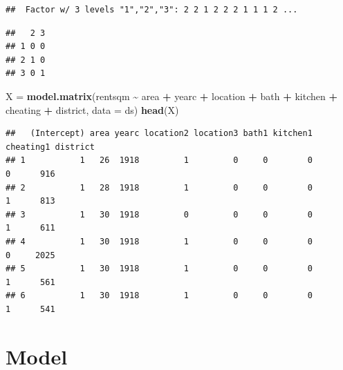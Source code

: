 \documentclass[
]{article}
\newenvironment{Shaded}{\begin{snugshade}}{\end{snugshade}}
\newcommand{\AttributeTok}[1]{\textcolor[rgb]{0.13,0.29,0.53}{#1}}
\newcommand{\FunctionTok}[1]{\textcolor[rgb]{0.13,0.29,0.53}{\textbf{#1}}}
\newcommand{\NormalTok}[1]{#1}
\newcommand{\OtherTok}[1]{\textcolor[rgb]{0.56,0.35,0.01}{#1}}
\newcommand{\SpecialCharTok}[1]{\textcolor[rgb]{0.81,0.36,0.00}{\textbf{#1}}}
\begin{document}
\begin{Shaded}
\end{Shaded}

\begin{verbatim}
##  Factor w/ 3 levels "1","2","3": 2 2 1 2 2 2 1 1 1 2 ...
\end{verbatim}

\begin{Shaded}
\end{Shaded}

\begin{verbatim}
##   2 3
## 1 0 0
## 2 1 0
## 3 0 1
\end{verbatim}

\begin{Shaded}
\begin{Highlighting}[]
\NormalTok{X }\OtherTok{=} \FunctionTok{model.matrix}\NormalTok{(rentsqm }\SpecialCharTok{\textasciitilde{}}\NormalTok{ area }\SpecialCharTok{+}\NormalTok{ yearc }\SpecialCharTok{+}\NormalTok{ location }\SpecialCharTok{+}\NormalTok{ bath }\SpecialCharTok{+}\NormalTok{ kitchen }\SpecialCharTok{+}
\NormalTok{    cheating }\SpecialCharTok{+}\NormalTok{ district, }\AttributeTok{data =}\NormalTok{ ds)}
\FunctionTok{head}\NormalTok{(X)}
\end{Highlighting}
\end{Shaded}

\begin{verbatim}
##   (Intercept) area yearc location2 location3 bath1 kitchen1 cheating1 district
## 1           1   26  1918         1         0     0        0         0      916
## 2           1   28  1918         1         0     0        0         1      813
## 3           1   30  1918         0         0     0        0         1      611
## 4           1   30  1918         1         0     0        0         0     2025
## 5           1   30  1918         1         0     0        0         1      561
## 6           1   30  1918         1         0     0        0         1      541
\end{verbatim}

\hypertarget{model}{%
\section{Model}\label{model}}
\end{document}
